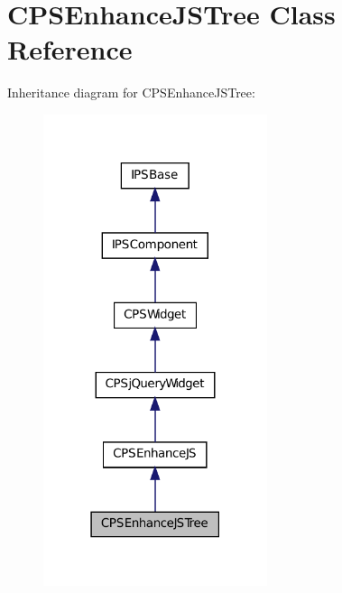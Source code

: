 \hypertarget{classCPSEnhanceJSTree}{
\section{CPSEnhanceJSTree Class Reference}
\label{classCPSEnhanceJSTree}
}


Inheritance diagram for CPSEnhanceJSTree:\nopagebreak
\begin{figure}[H]
\begin{center}
\leavevmode
\includegraphics[width=186pt]{classCPSEnhanceJSTree__inherit__graph}
\end{center}
\end{figure}


